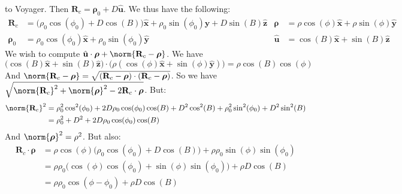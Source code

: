\documentclass[crop=false,class=article,oneside]{standalone}
\begin{document}
            to Voyager. Then
            $\mathbf{R}_{c}%
             =\boldsymbol{\rho}_{0}+D\hat{\mathbf{u}}$.
            We thus have the following:
            \begin{align*}
                \mathbf{R}_{c}
                &=\big(
                    \rho_{0}\cos(\phi_0)+D\cos(B)
                \big)\hat{\mathbf{x}}+
                \rho_{0}\sin(\phi_{0})\hat{\mathbf{y}}+
                D\sin(B)\hat{\mathbf{z}}
                &
                \boldsymbol{\rho}
                &=\rho\cos(\phi)\hat{\mathbf{x}}+
                \rho\sin(\phi)\hat{\mathbf{y}}\\
                \boldsymbol{\rho}_{0}
                &=\rho_{0}\cos(\phi_0)\hat{\mathbf{x}}+
                \rho_{0}\sin(\phi_{0})\hat{\mathbf{y}}
                &
                \hat{\mathbf{u}}
                &=\cos(B)\hat{\mathbf{x}}+\sin(B)\hat{\mathbf{z}}
            \end{align*}
            We wish to compute
            $\hat{\mathbf{u}}\cdot%
             \boldsymbol{\rho}+%
             \norm{\mathbf{R}_{c}-\boldsymbol{\rho}}$.
             We have
            \begin{equation*}
                \big(
                    \cos(B)\hat{\mathbf{x}}+\sin(B)\hat{\mathbf{z}}
                \big)\cdot\big(
                    \rho(\cos(\phi)\hat{\mathbf{x}}+
                    \sin(\phi)\hat{\mathbf{y}})
                \big)=\rho\cos(B)\cos(\phi)
            \end{equation*}
            And
            $\norm{\mathbf{R}_{c}-\boldsymbol{\rho}}%
             =\sqrt{(\mathbf{R}_{c}-%
                    \boldsymbol{\rho})\cdot(\mathbf{R}_{c}-%
                    \boldsymbol{\rho})}$.
            So we have
            $\sqrt{\norm{\mathbf{R}_{c}}^2+%
             \norm{\boldsymbol{\rho}}^2-%
             2\mathbf{R}_{c}\cdot\boldsymbol{\rho}}$.
            But:
            \begin{align*}
                \norm{\mathbf{R}_{c}}^{2}
                &=\rho_{0}^2\cos^2(\phi_0)+
                  2D\rho_{0}\cos(\phi_0)\cos(B)+D^2\cos^2(B)+
                  \rho_{0}^2\sin^2(\phi_0)+D^2\sin^2(B)\\
                &=\rho_{0}^2+D^2+2D\rho_{0}\cos(\phi_0)\cos(B)
            \end{align*}
            And $\norm{\boldsymbol{\rho}}^{2}=\rho^{2}$.
            But also:
            \begin{align*}
                \mathbf{R}_{c}\cdot\boldsymbol{\rho}
                &=\rho\cos(\phi)\big(
                      \rho_{0}\cos(\phi_{0})+D\cos(B)
                  \big)+\rho\rho_{0}\sin(\phi)\sin(\phi_{0})\\
                &=\rho\rho_{0}\big(
                      \cos(\phi)\cos(\phi_{0})+
                      \sin(\phi)\sin(\phi_{0})
                  \big)+\rho D\cos(B)\\
                &=\rho\rho_{0}\cos(\phi-\phi_{0})+\rho D\cos(B)
            \end{align*}
\end{document}
